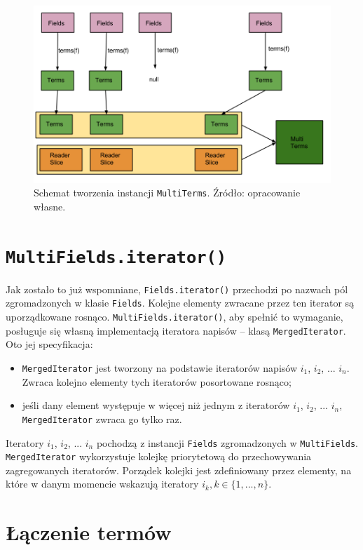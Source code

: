 \begin{figure}[here]
 \centering
 \includegraphics[scale=0.4]{pictures/MultiTerms.png}
 \caption{Schemat tworzenia instancji \texttt{MultiTerms}. Źródło: opracowanie własne. \label{fig:multiTerms}}
\end{figure}

\section{\texttt{MultiFields.iterator()}}

Jak zostało to już wspomniane, \texttt{Fields.iterator()} przechodzi po nazwach pól zgromadzonych w klasie \texttt{Fields}. Kolejne elementy zwracane przez ten iterator są uporządkowane rosnąco. \texttt{MultiFields.iterator()}, aby spełnić to wymaganie, posługuje się własną implementacją iteratora napisów -- klasą \texttt{MergedIterator}. Oto jej specyfikacja:
\begin{itemize}
 \item \texttt{MergedIterator} jest tworzony na podstawie iteratorów napisów $i_1$, $i_2$, ... $i_n$. Zwraca kolejno elementy tych iteratorów posortowane rosnąco; 
 \item jeśli dany element występuje w więcej niż jednym z iteratorów $i_1$, $i_2$, ... $i_n$, \texttt{MergedIterator} zwraca go tylko raz.
\end{itemize}
Iteratory $i_1$, $i_2$, ... $i_n$ pochodzą z instancji \texttt{Fields} zgromadzonych w \texttt{MultiFields}. \texttt{MergedIterator} wykorzystuje kolejkę priorytetową do przechowywania zagregowanych iteratorów. Porządek kolejki jest zdefiniowany przez elementy, na które w danym momencie wskazują iteratory $i_k, k \in \{1, ..., n\}$.

\section{Łączenie termów}


